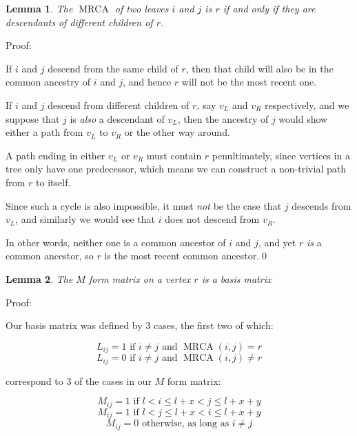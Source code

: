 \documentclass[10pt,a4paper]{report}
\DeclareMathOperator{\MRCA}{MRCA}
\newtheorem{lemma}{Lemma}
\begin{document}
\begin{lemma} The $\MRCA$ of two leaves $i$ and $j$ is $r$ if and only if they
are descendants of different children of $r$.  \end{lemma}

Proof:

If $i$ and $j$ descend from the same child of $r$, then that child will also be
in the common ancestry of $i$ and $j$, and hence $r$ will not be the most
recent one.

If $i$ and $j$ descend from different children of $r$, say $v_L$ and $v_R$
respectively, and we suppose that $j$ is \emph{also} a descendant of $v_L$,
then the ancestry of $j$ would show either a path from $v_L$ to $v_R$ or the
other way around.

A path ending in either $v_L$ or $v_R$ must contain $r$ penultimately, since
vertices in a tree only have one predecessor, which means we can construct a
non-trivial path from $r$ to itself.

Since such a cycle is also impossible, it must \emph{not} be the case that $j$
descends from $v_L$, and similarly we would see that $i$ does not descend from
$v_R$.

In other words, neither one is a common ancestor of $i$ and $j$, and yet $r$
\emph{is} a common ancestor, so $r$ is the most recent common ancestor.\qed{}

\begin{lemma} The $M$ form matrix on a vertex $r$ is a basis matrix
\end{lemma}

Proof:

Our basis matrix was defined by 3 cases, the first two of which:

\begin{equation} \label{L_eqn_yes}
	L_{ij} = 1 \textrm{ if } i \neq j \textrm{ and } \MRCA(i, j) = r
\end{equation}
\begin{equation} \label{L_eqn_no}
	L_{ij} = 0 \textrm{ if } i \neq j \textrm{ and } \MRCA(i, j) \neq r
\end{equation}

correspond to 3 of the cases in our $M$ form matrix:

\begin{equation} \label{M_eqn_lr}
	M_{ij} = 1 \textrm{ if } l < i \leq l + x < j \leq l + x + y
\end{equation}
\begin{equation} \label{M_eqn_rl}
	M_{ij} = 1 \textrm{ if } l < j \leq l + x < i \leq l + x + y
\end{equation}
\begin{equation} \label{M_eqn_no}
	M_{ij} = 0 \textrm{ otherwise, as long as } i \neq j
\end{equation}
\end{document}
